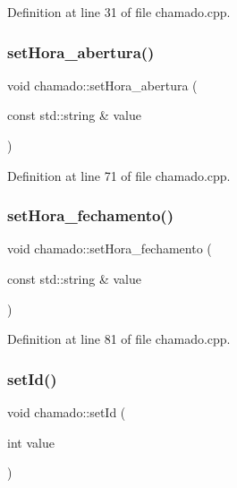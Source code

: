 Definition at line 31 of file chamado.\+cpp.

\hypertarget{classchamado_a46f5d88d083e43aef547d2883647ee5a}{}\label{classchamado_a46f5d88d083e43aef547d2883647ee5a} 
\subsubsection{\texorpdfstring{set\+Hora\+\_\+abertura()}{setHora\_abertura()}}
{\footnotesize\ttfamily void chamado\+::set\+Hora\+\_\+abertura (\begin{DoxyParamCaption}\item[{const std\+::string \&}]{value }\end{DoxyParamCaption})}



Definition at line 71 of file chamado.\+cpp.

\hypertarget{classchamado_a197bb7f1316be766cd8bd015a653961c}{}\label{classchamado_a197bb7f1316be766cd8bd015a653961c} 
\subsubsection{\texorpdfstring{set\+Hora\+\_\+fechamento()}{setHora\_fechamento()}}
{\footnotesize\ttfamily void chamado\+::set\+Hora\+\_\+fechamento (\begin{DoxyParamCaption}\item[{const std\+::string \&}]{value }\end{DoxyParamCaption})}



Definition at line 81 of file chamado.\+cpp.

\hypertarget{classchamado_a6a8b255c421c716980090610de0d9351}{}\label{classchamado_a6a8b255c421c716980090610de0d9351} 
\subsubsection{\texorpdfstring{set\+Id()}{setId()}}
{\footnotesize\ttfamily void chamado\+::set\+Id (\begin{DoxyParamCaption}\item[{int}]{value }\end{DoxyParamCaption})}



